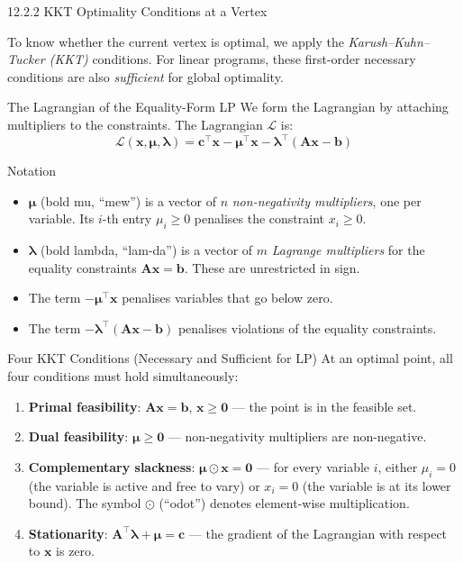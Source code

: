 \documentclass[aspectratio=169,10pt]{beamer}
\newcommand{\xv}{\mathbf{x}}
\newcommand{\cv}{\mathbf{c}}
\newcommand{\bv}{\mathbf{b}}
\newcommand{\Av}{\mathbf{A}}
\newcommand{\muv}{\boldsymbol{\mu}}
\newcommand{\lav}{\boldsymbol{\lambda}}
\begin{document}
\begin{frame}[allowframebreaks]{12.2.2 KKT Optimality Conditions at a Vertex}

To know whether the current vertex is optimal, we apply the
\emph{Karush--Kuhn--Tucker (KKT)} conditions.  For linear programs, these first-order
necessary conditions are also \emph{sufficient} for global optimality.

\begin{block}{The Lagrangian of the Equality-Form LP}
We form the Lagrangian by attaching multipliers to the constraints.
The Lagrangian $\mathcal{L}$ is:
\[
  \mathcal{L}(\xv,\muv,\lav)
  = \cv^\top\xv - \muv^\top\xv - \lav^\top(\Av\xv - \bv)
\]
\end{block}

\begin{block}{Notation}
\begin{itemize}
  \item $\muv$ (bold mu, ``mew'') is a vector of $n$ \emph{non-negativity multipliers},
        one per variable.  Its $i$-th entry $\mu_i \ge 0$ penalises the constraint
        $x_i \ge 0$.
  \item $\lav$ (bold lambda, ``lam-da'') is a vector of $m$ \emph{Lagrange multipliers}
        for the equality constraints $\Av\xv = \bv$.  These are unrestricted in sign.
  \item The term $-\muv^\top\xv$ penalises variables that go below zero.
  \item The term $-\lav^\top(\Av\xv - \bv)$ penalises violations of the equality
        constraints.
\end{itemize}
\end{block}

\begin{block}{Four KKT Conditions (Necessary and Sufficient for LP)}
At an optimal point, all four conditions must hold simultaneously:
\begin{enumerate}
  \item \textbf{Primal feasibility}: $\Av\xv = \bv$, $\xv \ge \mathbf{0}$ --- the
        point is in the feasible set.
  \item \textbf{Dual feasibility}: $\muv \ge \mathbf{0}$ --- non-negativity
        multipliers are non-negative.
  \item \textbf{Complementary slackness}: $\muv \odot \xv = \mathbf{0}$ --- for
        every variable $i$, either $\mu_i = 0$ (the variable is active and free to
        vary) or $x_i = 0$ (the variable is at its lower bound).  The symbol $\odot$
        (``odot'') denotes element-wise multiplication.
  \item \textbf{Stationarity}: $\Av^\top\lav + \muv = \cv$ --- the gradient of
        the Lagrangian with respect to $\xv$ is zero.
\end{enumerate}
\end{block}


\end{frame}
\end{document}
